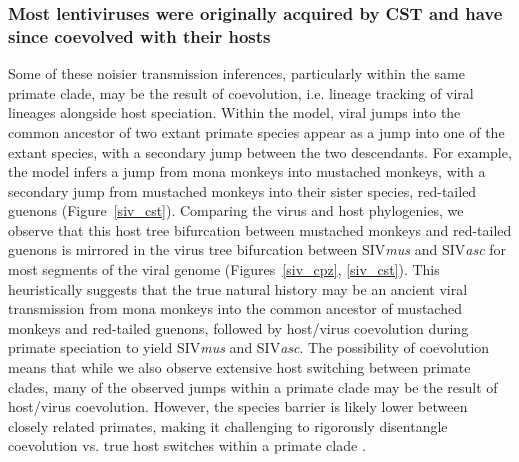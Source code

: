 \subsubsection*{Most lentiviruses were originally acquired by CST and have since coevolved with their hosts}
Some of these noisier transmission inferences, particularly within the same primate clade, may be the result of coevolution, i.e. lineage tracking of viral lineages alongside host speciation.
Within the model, viral jumps into the common ancestor of two extant primate species appear as a jump into one of the extant species, with a secondary jump between the two descendants.
For example, the model infers a jump from mona monkeys into mustached monkeys, with a secondary jump from mustached monkeys into their sister species, red-tailed guenons (Figure~\ref{siv_cst}).
Comparing the virus and host phylogenies, we observe that this host tree bifurcation between mustached monkeys and red-tailed guenons is mirrored in the virus tree bifurcation between SIV\textit{mus} and SIV\textit{asc} for most segments of the viral genome (Figures~\ref{siv_cpz}, \ref{siv_cst}).
This heuristically suggests that the true natural history may be an ancient viral transmission from mona monkeys into the common ancestor of mustached monkeys and red-tailed guenons, followed by host/virus coevolution during primate speciation to yield SIV\textit{mus} and SIV\textit{asc}.
The possibility of coevolution means that while we also observe extensive host switching between primate clades, many of the observed jumps within a primate clade may be the result of host/virus coevolution.
However, the species barrier is likely lower between closely related primates, making it challenging to rigorously disentangle coevolution vs. true host switches within a primate clade \citep{charleston2002preferential}.

